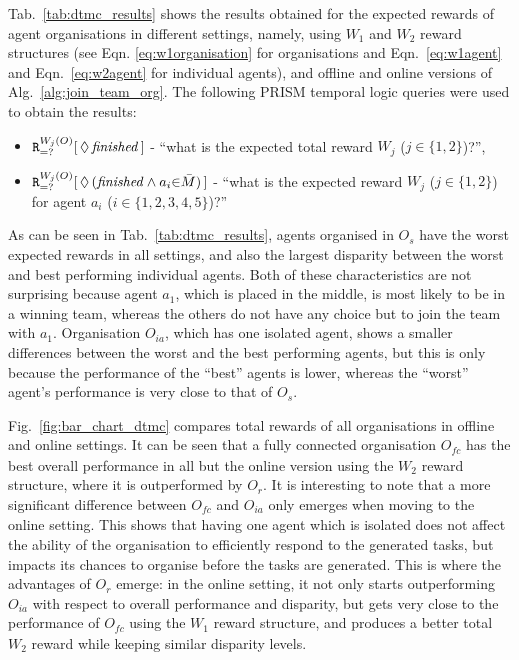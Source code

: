 \documentclass{llncs}
\begin{document}
\vspace{-25pt}
Tab.~\ref{tab:dtmc_results} shows the results obtained for the expected rewards of agent organisations in different settings, namely, using $W_1$ and $W_2$ reward structures (see Eqn. \eqref{eq:w1organisation} %
for organisations and Eqn.~\eqref{eq:w1agent} and Eqn.~\eqref{eq:w2agent} for individual agents), and offline and online versions of Alg.~\ref{alg:join_team_org}. The following PRISM temporal logic queries were used to obtain the results:
\vspace{-5pt}
\begin{itemize}
 \item ${\tt R}_{=?}^{W_{j}(O)}[\,\Diamond\,\mathit{finished}\,]$ -
``what is the expected total reward $W_j$ ($j\in\{1,2\}$)?'',
 \item ${\tt R}_{=?}^{W_{j}(O)}[\,\Diamond\,(\mathit{finished} \wedge a_i {\in} \bar{M}) \,]$ -
``what is the expected reward $W_j$ ($j\in\{1,2\}$) for agent $a_i$ ($i\in\{1,2,3,4,5\}$)?''
\end{itemize}
\vspace{-5pt}
As can be seen in Tab.~\ref{tab:dtmc_results}, agents organised in $O_s$ have the worst expected rewards in all settings, and also the largest disparity between the worst and best performing individual agents. Both of these characteristics are not surprising because agent $a_1$, which is placed in the middle, is most likely to be in a winning team, whereas the others do not have any choice but to join the team with $a_1$. Organisation $O_{ia}$, which has one isolated agent, shows a smaller differences between the worst and the best performing agents, but this is only because the performance of the ``best'' agents is lower, whereas the ``worst'' agent's performance is very close to that of $O_s$.

Fig.~\ref{fig:bar_chart_dtmc} compares total rewards of all organisations in offline and online settings. It can be seen that a fully connected organisation $O_{\mathit{fc}}$ has the best overall performance in all but the online version using the $W_2$ reward structure, where it is outperformed by $O_r$. It is interesting to note that a more significant difference between $O_{\mathit{fc}}$ and $O_{ia}$ only emerges when moving to the online setting. This shows that having one agent which is isolated does not affect the ability of the organisation to efficiently respond to the generated tasks, but impacts its chances to organise before the tasks are generated. This is where the advantages of $O_r$ emerge: in the online setting, it not only starts outperforming $O_{ia}$ with respect to overall performance and disparity, but gets very close to the performance of $O_{\mathit{fc}}$ using the $W_1$ reward structure, and produces a better total $W_2$ reward while keeping similar disparity levels.
\end{document}
